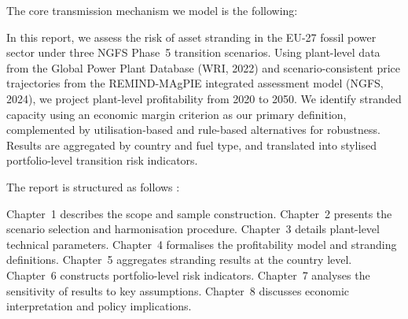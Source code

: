 \documentclass[a4paper, 12pt]{report}
\numberwithin{equation}{chapter}
\numberwithin{figure}{chapter}
\numberwithin{table}{chapter}
\begin{document}
\vspace{0.2cm}
The core transmission mechanism we model is the following:

\begin{figure}[H]
\centering
{}
\end{figure}

In this report, we assess the risk of asset stranding in the EU-27 fossil power sector under three NGFS Phase~5 transition scenarios. Using plant-level data from the Global Power Plant Database (WRI, 2022) and scenario-consistent price trajectories from the REMIND-MAgPIE integrated assessment model (NGFS, 2024), we project plant-level profitability from 2020 to 2050. We identify stranded capacity using an economic margin criterion as our primary definition, complemented by utilisation-based and rule-based alternatives for robustness. Results are aggregated by country and fuel type, and translated into stylised portfolio-level transition risk indicators.

\vspace{1cm}
\noindent The report is structured as follows :

\vspace{0.2cm}
Chapter~1 describes the scope and sample construction. 
Chapter~2 presents the scenario selection and harmonisation procedure. 
Chapter~3 details plant-level technical parameters. 
Chapter~4 formalises the profitability model and stranding definitions. 
Chapter~5 aggregates stranding results at the country level. Chapter~6 constructs portfolio-level risk indicators. 
Chapter~7 analyses the sensitivity of results to key assumptions. Chapter~8 discusses economic interpretation and policy implications.
\end{document}
